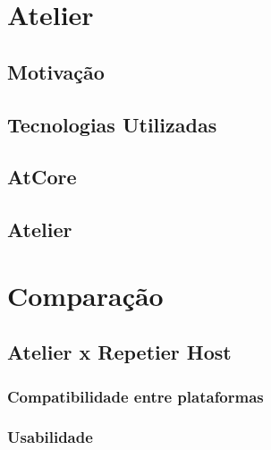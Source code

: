 \section{Atelier}
\subsection{Motivação}
\subsection{Tecnologias Utilizadas}
\subsection{AtCore}
\subsection{Atelier}

\section{Comparação}
\subsection{Atelier x Repetier Host}
\subsubsection{Compatibilidade entre plataformas}
\subsubsection{Usabilidade}
